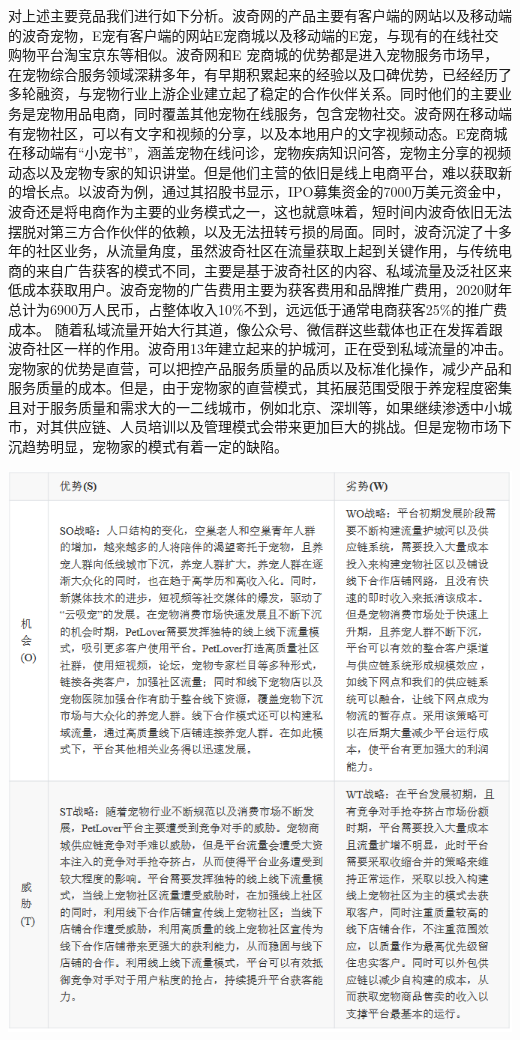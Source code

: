 \documentclass[a4paper]{ctexart}
\begin{document}
对上述主要竞品我们进行如下分析。波奇网的产品主要有客户端的网站以及移动端的波奇宠物，E宠有客户端的网站E宠商城以及移动端的E宠，与现有的在线社交购物平台淘宝京东等相似。波奇网和E 宠商城的优势都是进入宠物服务市场早，在宠物综合服务领域深耕多年，有早期积累起来的经验以及口碑优势，已经经历了多轮融资，与宠物行业上游企业建立起了稳定的合作伙伴关系。同时他们的主要业务是宠物用品电商，同时覆盖其他宠物在线服务，包含宠物社交。波奇网在移动端有宠物社区，可以有文字和视频的分享，以及本地用户的文字视频动态。E宠商城在移动端有“小宠书”，涵盖宠物在线问诊，宠物疾病知识问答，宠物主分享的视频动态以及宠物专家的知识讲堂。但是他们主营的依旧是线上电商平台，难以获取新的增长点。以波奇为例，通过其招股书显示，IPO募集资金的7000万美元资金中，波奇还是将电商作为主要的业务模式之一，这也就意味着，短时间内波奇依旧无法摆脱对第三方合作伙伴的依赖，以及无法扭转亏损的局面。同时，波奇沉淀了十多年的社区业务，从流量角度，虽然波奇社区在流量获取上起到关键作用，与传统电商的来自广告获客的模式不同，主要是基于波奇社区的内容、私域流量及泛社区来低成本获取用户。波奇宠物的广告费用主要为获客费用和品牌推广费用，2020财年总计为6900万人民币，占整体收入10\%不到，远远低于通常电商获客25\%的推广费成本。 随着私域流量开始大行其道，像公众号、微信群这些载体也正在发挥着跟波奇社区一样的作用。波奇用13年建立起来的护城河，正在受到私域流量的冲击。宠物家的优势是直营，可以把控产品服务质量的品质以及标准化操作，减少产品和服务质量的成本。但是，由于宠物家的直营模式，其拓展范围受限于养宠程度密集且对于服务质量和需求大的一二线城市，例如北京、深圳等，如果继续渗透中小城市，对其供应链、人员培训以及管理模式会带来更加巨大的挑战。但是宠物市场下沉趋势明显，宠物家的模式有着一定的缺陷。

\begin{center}
  \includegraphics[scale=0.7]{QQ截图20220114220853.png}
\end{center}
\end{document}
